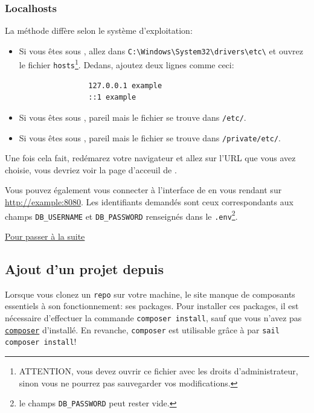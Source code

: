         \newpage
        \subsubsection[Localhosts][fr.wikipedia.org/wiki/Localhost]{Localhosts\label{sec:localhost}}
        La méthode diffère selon le système d'exploitation:
        \begin{itemize}
            \item Si vous êtes sous \windows{}, allez dans \verb|C:\Windows\System32\drivers\etc\| et ouvrez le fichier \verb|hosts|\footnote{ATTENTION, vous devez ouvrir ce fichier avec les droits d'administrateur, sinon vous ne pourrez pas sauvegarder vos modifications.}. Dedans, ajoutez deux lignes comme ceci:
            \begin{lstlisting}
                127.0.0.1 example
                ::1 example
            \end{lstlisting}
            \item Si vous êtes sous \linux{}, pareil mais le fichier se trouve dans \verb|/etc/|.
            \item Si vous êtes sous \macos{}, pareil mais le fichier se trouve dans \verb|/private/etc/|.
        \end{itemize}

        Une fois cela fait, redémarez votre navigateur et allez sur l'URL que vous avez choisie, vous devriez voir la page d'acceuil de \laravel{}.

        Vous pouvez également vous connecter à l'interface de \phpmyadmin en vous rendant sur \url{http://example:8080}. Les identifiants demandés sont ceux correspondants aux champs \verb|DB_USERNAME| et \verb|DB_PASSWORD| renseignés dans le \verb|.env|\footnote{le champs \verb|DB_PASSWORD| peut rester vide.}.

        \hyperref[sec:suite]{Pour passer à la suite}
    
    \newpage
    \subsection[Ajout d'un projet depuis GitHub]{Ajout d'un projet depuis \github{}\label{sec:project_git}}

    Lorsque vous clonez un \texttt{repo} sur votre machine, le site manque de composants essentiels à son fonctionnement: ses packages. Pour installer ces packages, il est nécessaire d'effectuer la commande \verb|composer install|, sauf que vous n'avez pas \texttt{\href{https://getcomposer.org/doc/00-intro.md}{composer}} d'installé. En revanche, \texttt{composer} est utilisable grâce à  \laravelsail{} par \verb|sail composer install|!

